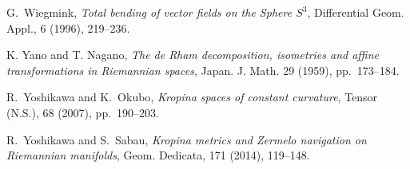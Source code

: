 \documentclass[reqno,10pt]{amsart}
\begin{document}
\begin{thebibliography}{10}
     

 {\sc G.~Wiegmink}, {\em  Total bending of vector fields on the Sphere $S^3$},  Differential Geom. Appl., 6 (1996), 219--236.

 {\sc K. Yano and T. Nagano}, {\em
The de Rham decomposition, isometries and affine transformations in Riemannian spaces},
Japan. J. Math. 29 (1959), pp.~173--184.


{\sc R.~Yoshikawa and K.~Okubo}, {\em Kropina spaces of constant curvature},
  Tensor (N.S.), 68 (2007), pp.~190--203.
  
{\sc R.~Yoshikawa and S.~Sabau}, {\em Kropina metrics and {Z}ermelo navigation on {R}iemannian
              manifolds}, Geom. Dedicata, 171 (2014), 119--148. 




\end{thebibliography}
\end{document}

